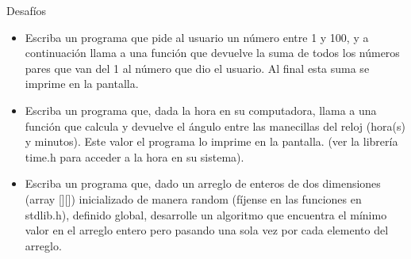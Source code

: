 \documentclass{beamer}
\begin{document}
\begin{frame}[fragile]{Desafíos}
\begin{itemize}
\item Escriba un programa que pide al usuario un número entre 1 y 100, y a continuación llama a una función que devuelve la suma de todos los números pares que van del 1 al número que dio el usuario. Al final esta suma se imprime en la pantalla.

\item Escriba un programa que, dada la hora en su computadora, llama a una función que calcula y devuelve el ángulo entre las manecillas del reloj (hora(s) y minutos). Este valor el programa lo imprime en la pantalla. (ver la librería time.h para acceder a la hora en su sistema).

\item Escriba un programa que, dado un arreglo de enteros de dos dimensiones (array [][]) inicializado de manera random (fíjense en las funciones en stdlib.h), definido global, desarrolle un algoritmo que encuentra el mínimo valor en el arreglo entero pero pasando una sola vez por cada elemento del arreglo.
\end{itemize}
\end{frame}
\end{document}
